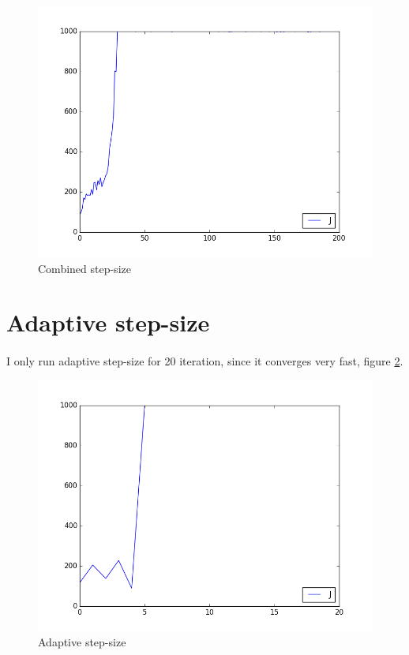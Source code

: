 \documentclass[]{article}
\begin{document}
\begin{figure}
	\centering
	\includegraphics[width=\linewidth]{wolfe+decrease.png}
	\caption{\label{fig:wolfe+decrease}Combined step-size}
\end{figure}

\section{Adaptive step-size}
\paragraph{}I only run adaptive step-size for 20 iteration, since it converges very fast, figure \ref{fig:adp-step-size}.
\begin{figure}
	\centering
	\includegraphics[width=\linewidth]{FD_Rprop.png}
	\caption{\label{fig:adp-step-size}Adaptive step-size}
\end{figure}
\end{document}
